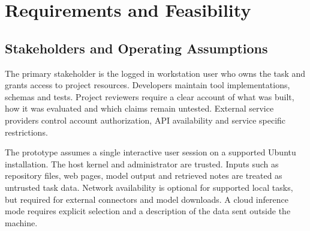 \chapter{Requirements and Feasibility}
\section{Stakeholders and Operating Assumptions}
The primary stakeholder is the logged in workstation user who owns the task and grants access to project resources. Developers maintain tool implementations, schemas and tests. Project reviewers require a clear account of what was built, how it was evaluated and which claims remain untested. External service providers control account authorization, API availability and service specific restrictions.

The prototype assumes a single interactive user session on a supported Ubuntu installation. The host kernel and administrator are trusted. Inputs such as repository files, web pages, model output and retrieved notes are treated as untrusted task data. Network availability is optional for supported local tasks, but required for external connectors and model downloads. A cloud inference mode requires explicit selection and a description of the data sent outside the machine.

